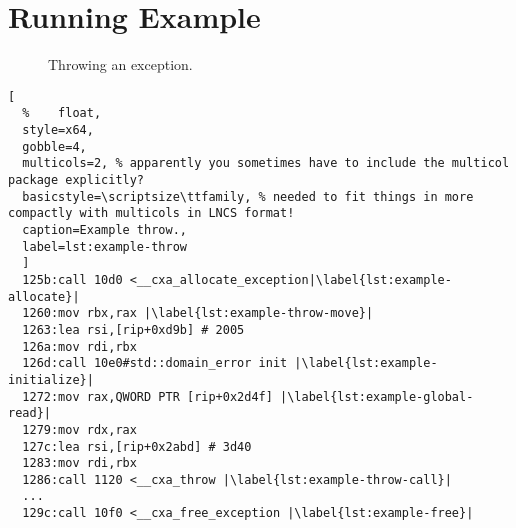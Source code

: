 \section{Running Example}\label{sec:example}
\begin{figure}
  \centering
  \caption{Throwing an exception.}\label{fig:example-unwinding}
\end{figure}
\begin{lstlisting}[
  %    float,
  style=x64,
  gobble=4,
  multicols=2, % apparently you sometimes have to include the multicol package explicitly?
  basicstyle=\scriptsize\ttfamily, % needed to fit things in more compactly with multicols in LNCS format!
  caption=Example throw.,
  label=lst:example-throw
  ]
  125b:call 10d0 <__cxa_allocate_exception|\label{lst:example-allocate}|
  1260:mov rbx,rax |\label{lst:example-throw-move}|
  1263:lea rsi,[rip+0xd9b] # 2005
  126a:mov rdi,rbx
  126d:call 10e0#std::domain_error init |\label{lst:example-initialize}|
  1272:mov rax,QWORD PTR [rip+0x2d4f] |\label{lst:example-global-read}|
  1279:mov rdx,rax
  127c:lea rsi,[rip+0x2abd] # 3d40
  1283:mov rdi,rbx
  1286:call 1120 <__cxa_throw |\label{lst:example-throw-call}|
  ...
  129c:call 10f0 <__cxa_free_exception |\label{lst:example-free}|
\end{lstlisting}
